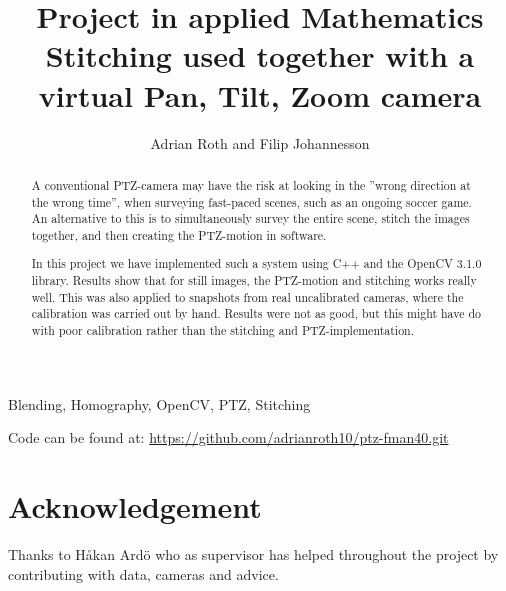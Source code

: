 \documentclass[10 pt, journal]{IEEEtran}
\title{Project in applied Mathematics \\
  \large Stitching used together with a virtual Pan, Tilt, Zoom camera}
\author{Adrian Roth and Filip Johannesson}
\begin{document}
\maketitle
\begin{abstract}
	A conventional PTZ-camera may have the risk at looking in the ''wrong direction at the wrong time'', when surveying fast-paced scenes, such as an ongoing soccer game. An alternative to this is to simultaneously survey the entire scene, stitch the images together, and then creating the PTZ-motion in software.

	In this project we have implemented such a system using C++ and the OpenCV 3.1.0 library. Results show that for still images, the PTZ-motion and stitching works really well.
	This was also applied to snapshots from real uncalibrated cameras, where the calibration was carried out by hand.
	Results were not as good, but this might have do with poor calibration rather than the stitching and PTZ-implementation.
\end{abstract}
\begin{IEEEkeywords}
	Blending, Homography, OpenCV, PTZ, Stitching
\end{IEEEkeywords}
Code can be found at:
\url{https://github.com/adrianroth10/ptz-fman40.git}











\section{Acknowledgement}
Thanks to Håkan Ardö who as supervisor has helped throughout the project by contributing with data, cameras and advice.





\end{document}
